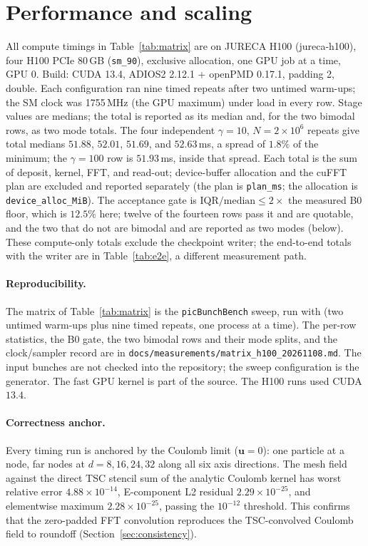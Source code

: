 \section{Performance and scaling}
\label{sec:scaling}

All compute timings in Table~\ref{tab:matrix} are on JURECA H100
(jureca-h100), four H100 PCIe 80\,GB (\texttt{sm\_90}),
exclusive allocation, one GPU job at a time, GPU 0. Build: CUDA 13.4,
ADIOS2 2.12.1 + openPMD 0.17.1, padding 2, double. Each configuration ran
nine timed repeats after two untimed warm-ups; the SM clock was 1755\,MHz
(the GPU maximum) under load in every row. Stage values are medians; the
total is reported as its median and, for the two bimodal rows, as two mode
totals. The four independent $\gamma=10$, $N=2\times10^6$ repeats give
total medians $51.88$, $52.01$, $51.69$, and $52.63$\,ms, a spread of
$1.8\%$ of the minimum; the $\gamma=100$ row is $51.93$\,ms, inside that
spread. Each total is the sum of deposit, kernel, FFT, and read-out;
device-buffer allocation and the cuFFT plan are excluded and reported
separately (the plan is \texttt{plan\_ms}; the allocation is
\texttt{device\_alloc\_MiB}). The acceptance gate is
$\mathrm{IQR}/\mathrm{median}\le 2\times$ the measured B0 floor, which is
$12.5\%$ here; twelve of the fourteen rows pass it and are quotable, and the
two that do not are bimodal and are reported as two modes (below). These
compute-only totals exclude the checkpoint writer; the end-to-end totals
with the writer are in Table~\ref{tab:e2e}, a different measurement path.

\paragraph{Reproducibility.}
The matrix of Table~\ref{tab:matrix} is the \texttt{picBunchBench} sweep,
run with
(two untimed warm-ups plus nine timed repeats, one process at a time). The
per-row statistics, the B0 gate, the two bimodal rows and their mode
splits, and the clock/sampler record are in
\texttt{docs/measurements/matrix\_h100\_20261108.md}. The input bunches
are not checked into the repository; the sweep configuration is the
generator. The fast GPU kernel
 is part of the source.
The H100 runs used CUDA $13.4$.

\paragraph{Correctness anchor.}
Every timing run is anchored by the Coulomb limit ($\mathbf{u}=0$): one
particle at a node, far nodes at $d=8,16,24,32$ along all six axis
directions. The mesh field against the direct TSC stencil sum of the
analytic Coulomb kernel has worst relative error $4.88\times10^{-14}$, E-component L2
residual $2.29\times10^{-25}$, and elementwise maximum
$2.28\times10^{-25}$, passing the $10^{-12}$ threshold. This
confirms that the zero-padded FFT convolution reproduces the TSC-convolved
Coulomb field to roundoff (Section~\ref{sec:consistency}).

